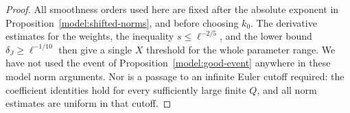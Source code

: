 \begin{proof}
All smoothness orders used here are fixed after the absolute exponent
in Proposition~\ref{model:shifted-norms}, and before choosing $k_0$.
The derivative estimates for the weights, the inequality
$s\le\ell^{-2/5}$, and the lower bound
$\delta_J\ge\ell^{-1/10}$ then give a single $X$ threshold for the
whole parameter range.  We have not used the event of
Proposition~\ref{model:good-event} anywhere in these model norm
arguments.  Nor is a passage to an infinite Euler cutoff required:
the coefficient identities hold for every sufficiently large finite
$Q$, and all norm estimates are uniform in that cutoff.
\end{proof}
